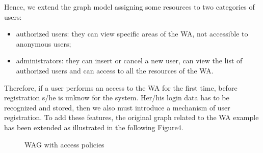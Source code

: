 \normalsize
Hence, we extend the graph model assigning some resources to two categories of users:

\footnotesize
\begin{itemize}
	\item authorized users: they can view specific areas of the WA, not accessible to anonymous users;
	\item administrators: they can insert or cancel a new user, can view the list of authorized users and can access to all the resources of the WA. 
\end{itemize}

\normalsize
Therefore, if a user performs an access to the WA for the first time, before registration s/he is unknow for the system. Her/his login data has to be recognized and stored, then we also must introduce a mechanism of user registration. To add these features, the original graph related to the WA example has been extended as illustrated in the following Figure4.

\begin{figure}[ht]
\centerline{}
\caption{WAG with access policies \label{fig4}}
\end{figure}

